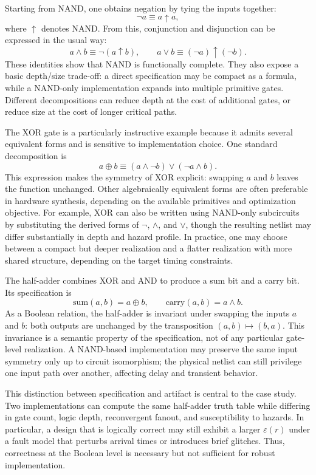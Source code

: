 \documentclass[11pt]{article}
\begin{document}
Starting from NAND, one obtains negation by tying the inputs together:
\[
\neg a \equiv a \mathbin{\uparrow} a,
\]
where \(\uparrow\) denotes NAND. From this, conjunction and disjunction can be expressed in the usual way:
\[
 a \wedge b \equiv \neg(a \mathbin{\uparrow} b),
\qquad
 a \vee b \equiv (\neg a) \mathbin{\uparrow} (\neg b).
\]
These identities show that NAND is functionally complete. They also expose a basic depth/size trade-off: a direct specification may be compact as a formula, while a NAND-only implementation expands into multiple primitive gates. Different decompositions can reduce depth at the cost of additional gates, or reduce size at the cost of longer critical paths.

The XOR gate is a particularly instructive example because it admits several equivalent forms and is sensitive to implementation choice. One standard decomposition is
\[
 a \oplus b \equiv (a \wedge \neg b) \vee (\neg a \wedge b).
\]
This expression makes the symmetry of XOR explicit: swapping \(a\) and \(b\) leaves the function unchanged. Other algebraically equivalent forms are often preferable in hardware synthesis, depending on the available primitives and optimization objective. For example, XOR can also be written using NAND-only subcircuits by substituting the derived forms of \(\neg\), \(\wedge\), and \(\vee\), though the resulting netlist may differ substantially in depth and hazard profile. In practice, one may choose between a compact but deeper realization and a flatter realization with more shared structure, depending on the target timing constraints.

The half-adder combines XOR and AND to produce a sum bit and a carry bit. Its specification is
\[
\mathrm{sum}(a,b) = a \oplus b, 
\qquad
\mathrm{carry}(a,b) = a \wedge b.
\]
As a Boolean relation, the half-adder is invariant under swapping the inputs \(a\) and \(b\): both outputs are unchanged by the transposition \((a,b) \mapsto (b,a)\). This invariance is a semantic property of the specification, not of any particular gate-level realization. A NAND-based implementation may preserve the same input symmetry only up to circuit isomorphism; the physical netlist can still privilege one input path over another, affecting delay and transient behavior.

This distinction between specification and artifact is central to the case study. Two implementations can compute the same half-adder truth table while differing in gate count, logic depth, reconvergent fanout, and susceptibility to hazards. In particular, a design that is logically correct may still exhibit a larger \(\varepsilon(r)\) under a fault model that perturbs arrival times or introduces brief glitches. Thus, correctness at the Boolean level is necessary but not sufficient for robust implementation.
\end{document}
